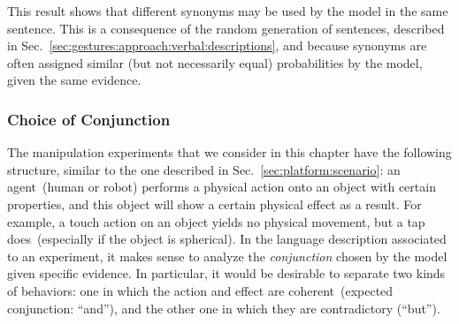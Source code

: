This result shows that different synonyms may be used by the model in the same sentence.
This is a consequence of the random generation of sentences, described in Sec.~\ref{sec:gestures:approach:verbal:descriptions}, and because synonyms are often assigned similar (but not necessarily equal) probabilities by the model, given the same evidence.

\subsubsection{Choice of Conjunction}
\label{sec:gestures:results:verbal:conjunction}

The manipulation experiments that we consider in this chapter have the following structure, similar to the one described in Sec.~\ref{sec:platform:scenario}: an agent~(human or robot) performs a physical action onto an object with certain properties, and this object will show a certain physical effect as a result.
For example, a touch action on an object yields no physical movement, but a tap does~(especially if the object is spherical).
In the language description associated to an experiment, it makes sense to analyze the \emph{conjunction} chosen by the model given specific evidence.
In particular, it would be desirable to separate two kinds of behaviors: one in which the action and effect are coherent~(expected conjunction: ``and''), and the other one in which they are contradictory (``but'').

\newcommand{\evidenceProducingAnd}{$\xobs=$\{ Action=grasp, ObjVel=medium \}}
\newcommand{\evidenceProducingBut}{$\xobs=$\{ Action=grasp, ObjVel=slow \}}

